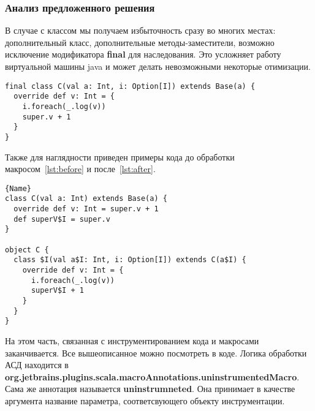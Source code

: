 \subsubsection{Анализ предложенного решения}

В случае с классом мы получаем избыточность сразу во многих местах:
дополнительный класс, дополнительные методы-заместители, возможно исключение
модификатора \textbf{final} для наследования.
Это усложняет работу виртуальной машины java и может делать невозможными
некоторые отимизации.


\begin{lstlisting}[caption={До применения макроса},label=lst:before]
final class C(val a: Int, i: Option[I]) extends Base(a) {
  override def v: Int = {
    i.foreach(_.log(v))
    super.v + 1
  }
}
\end{lstlisting}

Также для наглядности приведен примеры кода до обработки
макросом~\ref{lst:before}
и после~\ref{lst:after}.

\begin{lstlisting}[caption={После применения макроса},label=lst:after]{Name}
class C(val a: Int) extends Base(a) {
  override def v: Int = super.v + 1
  def superV$I = super.v
}

object C {
  class $I(val a$I: Int, i: Option[I]) extends C(a$I) {
    override def v: Int = {
      i.foreach(_.log(v))
      superV$I + 1
    }
  }
}
\end{lstlisting}


На этом часть, связанная с инструментированием кода и макросами заканчивается.
Все вышеописанное можно посмотреть в коде.
Логика обработки АСД находится в
\textbf{org.jetbrains.plugins.scala.macroAnnotations.uninstrumentedMacro}.
Сама же аннотация называется \textbf{uninstrumneted}.
Она принимает в качестве
аргумента название параметра, соответсвующего объекту инструментации.

%
%
%
%
